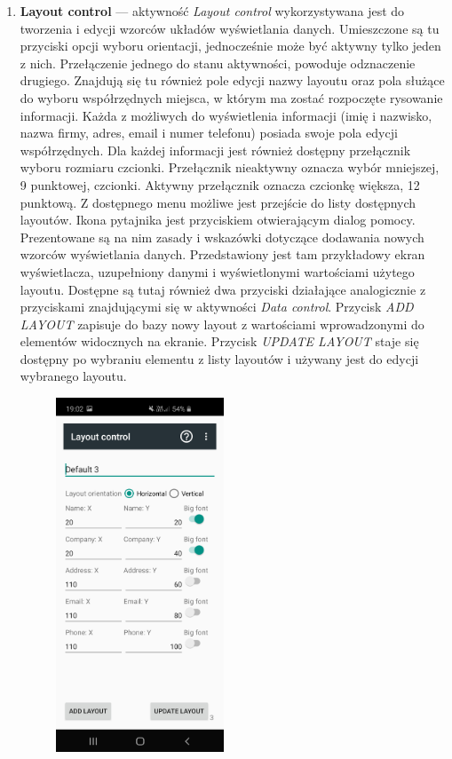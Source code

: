 \documentclass[a4paper,12pt, twoside]{article}
\begin{document}
\begin{enumerate}
    	   \item \textbf{Layout control} — aktywność \textit{Layout control} wykorzystywana jest do tworzenia i edycji wzorców układów wyświetlania danych. Umieszczone są tu przyciski opcji wyboru orientacji, jednocześnie może być aktywny tylko jeden z nich. Przełączenie jednego do stanu aktywności, powoduje odznaczenie drugiego. Znajdują się tu również pole edycji nazwy layoutu oraz pola służące do wyboru współrzędnych miejsca, w którym ma zostać rozpoczęte rysowanie informacji. Każda z możliwych do wyświetlenia informacji (imię i nazwisko, nazwa firmy, adres, email i numer telefonu) posiada swoje pola edycji współrzędnych. Dla każdej informacji jest również dostępny przełącznik wyboru rozmiaru czcionki. Przełącznik nieaktywny oznacza wybór mniejszej, 9 punktowej, czcionki. Aktywny przełącznik oznacza czcionkę większa, 12 punktową. Z dostępnego menu możliwe jest przejście do listy dostępnych layoutów. Ikona pytajnika jest przyciskiem otwierającym dialog pomocy. Prezentowane są na nim zasady i wskazówki dotyczące dodawania nowych wzorców wyświetlania danych. Przedstawiony jest tam przykładowy ekran wyświetlacza, uzupełniony danymi i wyświetlonymi wartościami użytego layoutu.
    	   Dostępne są tutaj również dwa przyciski działające analogicznie z przyciskami znajdującymi się w aktywności \textit{Data control}. Przycisk \textit{ADD LAYOUT} zapisuje do bazy nowy layout z wartościami wprowadzonymi do elementów widocznych na ekranie. Przycisk \textit{UPDATE LAYOUT} staje się dostępny po wybraniu elementu z listy layoutów i używany jest do edycji wybranego layoutu.
    	   \begin{figure}[H]
    	        \centering
    	        \includegraphics[width=5cm]{images/view_layoutEdit.jpg}

\end{figure}
\end{enumerate}
\end{document}
